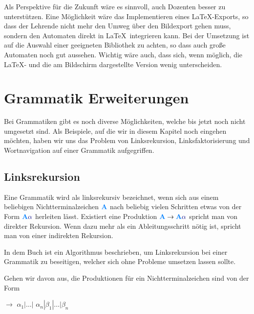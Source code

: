 Als Perspektive für die Zukunft wäre es sinnvoll, auch Dozenten besser zu
unterstützen. Eine Möglichkeit wäre das Implementieren eines \LaTeX-Exports, so
dass der Lehrende nicht mehr den Umweg über den Bildexport gehen muss, sondern
den Automaten direkt in \LaTeX\ integrieren kann. Bei der Umsetzung ist auf die
Auswahl einer geeigneten Bibliothek zu achten, so dass auch große Automaten
noch gut aussehen. Wichtig wäre auch, dass sich, wenn möglich, die \LaTeX-
und die am Bildschirm dargestellte Version wenig unterscheiden.\vspace{10pt}


\section{Grammatik Erweiterungen}

Bei Grammatiken gibt es noch diverse Möglichkeiten, welche bis jetzt noch nicht
umgesetzt sind. Als Beispiele, auf die wir in diesem Kapitel noch eingehen
möchten, haben wir uns das Problem von Linksrekursion, Linksfaktorisierung und
Wortnavigation auf einer Grammatik aufgegriffen.\vspace{10pt}

\subsection{Linksrekursion}

Eine Grammatik wird als linksrekursiv bezeichnet, wenn sich aus einem beliebigen
Nichtterminalzeichen $\NonterminalSymbol{A}$ nach beliebig vielen Schritten etwas
von der Form $\NonterminalSymbol{A} \TerminalSymbol{$\alpha$}$ herleiten lässt.
Existiert eine Produktion $\NonterminalSymbol{A} \to \NonterminalSymbol{A}
\TerminalSymbol{$\alpha$}$ spricht man von direkter Rekursion. Wenn dazu mehr als
ein Ableitungsschritt nötig ist, spricht man von einer indirekten
Rekursion.\vspace{10pt}

In dem Buch \cite{Compilers} ist ein Algorithmus beschrieben, um Linksrekursion
bei einer Grammatik zu beseitigen, welcher sich ohne Probleme umsetzen lassen
sollte.\vspace{10pt}

\noindent Gehen wir davon aus, die Produktionen für ein Nichtterminalzeichen
 sind von der Form\vspace{10pt}

 $\to$ $\alpha_1|\ldots|$
$\alpha_n | \beta_1 | \ldots | \beta_n$\vspace{10pt}

